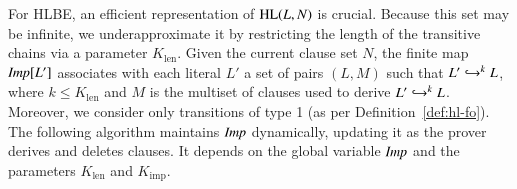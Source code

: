 % 
% 
For HLBE, an efficient representation of $\HL(L,N)$ is crucial. Because
this set may be infinite, we underapproximate it by
restricting the length of the
transitive chains via a parameter $K_\mathrm{len}$. Given the current
clause set $N$, the finite map $\impmap[L']$ associates with each literal $L'$
a set of pairs $(L,M)$ such that $L' \bigfimpl{N}^k L$, where $k \leq
K_\mathrm{len}$ and $M$ is the multiset of clauses used to derive $L' \bigfimpl{N}^k L$.
Moreover, we consider only transitions of type 1 (as per
Definition~\ref{def:hl-fo}).
The following algorithm
maintains $\impmap$ dynamically, updating it as the prover derives and deletes
clauses.
It depends on the global variable $\impmap$ and the parameters
$K_\mathrm{len}$ and $K_{\mathrm{imp}}$.



\algrenewcommand{}
\algrenewcommand\algorithmicindent{0.75em}


